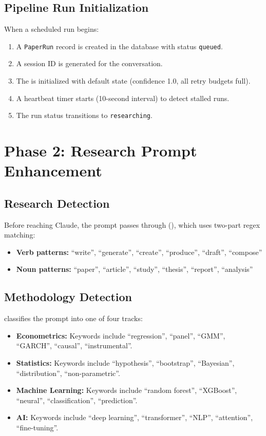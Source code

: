 \subsection{Pipeline Run Initialization}

When a scheduled run begins:

\begin{enumerate}
  \item A \texttt{PaperRun} record is created in the database with status \texttt{queued}.
  \item A session ID is generated for the conversation.
  \item The \governor is initialized with default state (confidence 1.0, all retry budgets full).
  \item A heartbeat timer starts (10-second interval) to detect stalled runs.
  \item The run status transitions to \texttt{researching}.
\end{enumerate}

\section{Phase 2: Research Prompt Enhancement}
\label{sec:pipeline:enhancement}

\subsection{Research Detection}

Before reaching Claude, the prompt passes through  (), which uses two-part regex matching:

\begin{itemize}
  \item \textbf{Verb patterns:} ``write'', ``generate'', ``create'', ``produce'', ``draft'', ``compose''
  \item \textbf{Noun patterns:} ``paper'', ``article'', ``study'', ``thesis'', ``report'', ``analysis''
\end{itemize}

\subsection{Methodology Detection}

 classifies the prompt into one of four tracks:

\begin{itemize}
  \item \textbf{Econometrics:} Keywords include ``regression'', ``panel'', ``GMM'', ``GARCH'', ``causal'', ``instrumental''.
  \item \textbf{Statistics:} Keywords include ``hypothesis'', ``bootstrap'', ``Bayesian'', ``distribution'', ``non-parametric''.
  \item \textbf{Machine Learning:} Keywords include ``random forest'', ``XGBoost'', ``neural'', ``classification'', ``prediction''.
  \item \textbf{AI:} Keywords include ``deep learning'', ``transformer'', ``NLP'', ``attention'', ``fine-tuning''.
\end{itemize}

